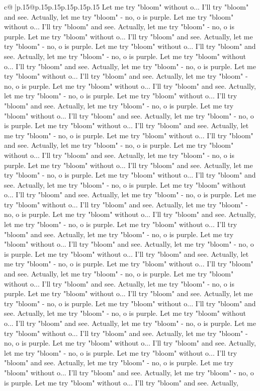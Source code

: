 \documentclass{article}
\begin{document}
{\begin{supertabular}{c@{$\;$}|p{.15\linewidth}@{}p{.15\linewidth}p{.15\linewidth}p{.15\linewidth}p{.15\linewidth}p{.15\linewidth}}
{{{Let me try "bloom" without o... I'll try "bloom" and see. Actually, let me try "bloom" {-} no, o is purple. Let me try "bloom" without o... I'll try "bloom" and see. Actually, let me try "bloom" {-} no, o is purple. Let me try "bloom" without o... I'll try "bloom" and see. Actually, let me try "bloom" {-} no, o is purple. Let me try "bloom" without o... I'll try "bloom" and see. Actually, let me try "bloom" {-} no, o is purple. Let me try "bloom" without o... I'll try "bloom" and see. Actually, let me try "bloom" {-} no, o is purple. Let me try "bloom" without o... I'll try "bloom" and see. Actually, let me try "bloom" {-} no, o is purple. Let me try "bloom" without o... I'll try "bloom" and see. Actually, let me try "bloom" {-} no, o is purple. Let me try "bloom" without o... I'll try "bloom" and see. Actually, let me try "bloom" {-} no, o is purple. Let me try "bloom" without o... I'll try "bloom" and see. Actually, let me try "bloom" {-} no, o is purple. Let me try "bloom" without o... I'll try "bloom" and see. Actually, let me try "bloom" {-} no, o is purple. Let me try "bloom" without o... I'll try "bloom" and see. Actually, let me try "bloom" {-} no, o is purple. Let me try "bloom" without o... I'll try "bloom" and see. Actually, let me try "bloom" {-} no, o is purple. Let me try "bloom" without o... I'll try "bloom" and see. Actually, let me try "bloom" {-} no, o is purple. Let me try "bloom" without o... I'll try "bloom" and see. Actually, let me try "bloom" {-} no, o is purple. Let me try "bloom" without o... I'll try "bloom" and see. Actually, let me try "bloom" {-} no, o is purple. Let me try "bloom" without o... I'll try "bloom" and see. Actually, let me try "bloom" {-} no, o is purple. Let me try "bloom" without o... I'll try "bloom" and see. Actually, let me try "bloom" {-} no, o is purple. Let me try "bloom" without o... I'll try "bloom" and see. Actually, let me try "bloom" {-} no, o is purple. Let me try "bloom" without o... I'll try "bloom" and see. Actually, let me try "bloom" {-} no, o is purple. Let me try "bloom" without o... I'll try "bloom" and see. Actually, let me try "bloom" {-} no, o is purple. Let me try "bloom" without o... I'll try "bloom" and see. Actually, let me try "bloom" {-} no, o is purple. Let me try "bloom" without o... I'll try "bloom" and see. Actually, let me try "bloom" {-} no, o is purple. Let me try "bloom" without o... I'll try "bloom" and see. Actually, let me try "bloom" {-} no, o is purple. Let me try "bloom" without o... I'll try "bloom" and see. Actually, let me try "bloom" {-} no, o is purple. Let me try "bloom" without o... I'll try "bloom" and see. Actually, let me try "bloom" {-} no, o is purple. Let me try "bloom" without o... I'll try "bloom" and see. Actually, let me try "bloom" {-} no, o is purple. Let me try "bloom" without o... I'll try "bloom" and see. Actually, let me try "bloom" {-} no, o is purple. Let me try "bloom" without o... I'll try "bloom" and see. Actually, let me try "bloom" {-} no, o is purple. Let me try "bloom" without o... I'll try "bloom" and see. Actually, let me try "bloom" {-} no, o is purple. Let me try "bloom" without o... I'll try "bloom" and see. Actually, }}}
\end{supertabular}}
\end{document}
